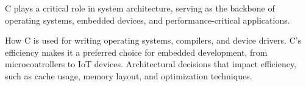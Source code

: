 \begin{comment}
2.7 SIMD and CPU Architecture Integration
2.7.1 Introduction to SIMD (Single Instruction, Multiple Data)
2.7.1.1 What is SIMD and Why It Matters

2.7.1.2 How C Interfaces with SIMD Instructions

2.7.1.3 Differences Between Vectorized and Scalar Operations

2.7.2 MMX and SSE Evolution
2.7.2.1 MMX – The First Consumer SIMD Extension (1996)

2.7.2.1.1 Legacy 64-bit MMX Registers

2.7.2.1.2 MMX and Its Limitations

2.7.2.2 SSE (Streaming SIMD Extensions) Series

2.7.2.2.1 SSE1 (#include <xmmintrin.h>)

2.7.2.2.2 SSE2 (#include <emmintrin.h>) and 128-bit Registers

2.7.2.2.3 SSE3, SSSE3, and SSE4.x Enhancements

2.7.3 AVX and AVX2 – The 256-bit Revolution
2.7.3.1 Introduction to AVX

2.7.3.2 Key AVX Instructions (#include <immintrin.h>)

2.7.3.3 How AVX2 Improved Integer Performance

2.7.4 Detecting CPU Features and Using Them Safely
2.7.4.1 Checking CPU Capabilities (cpuid)

2.7.4.2 Writing Portable SIMD Code

2.7.4.3 Compiler Support for SIMD Optimizations

2.7.5 Future of SIMD – AVX-512 and Beyond
2.7.5.1 AVX-512 Registers and Expansions

2.7.5.2 Practical Use Cases of AVX-512
\end{comment}

\begin{NxSBox}[][Architecture in C]
	\begin{NxIDBox}
		C plays a critical role in system architecture, serving as the backbone of operating systems, embedded devices, and performance-critical applications.
	\end{NxIDBox}
	\begin{NxIDBoxL}
		 How C is used for writing operating systems, compilers, and device drivers.
		 C’s efficiency makes it a preferred choice for embedded development, from microcontrollers to IoT devices.
		 Architectural decisions that impact efficiency, such as cache usage, memory layout, and optimization techniques.
	\end{NxIDBoxL}
\end{NxSBox}


